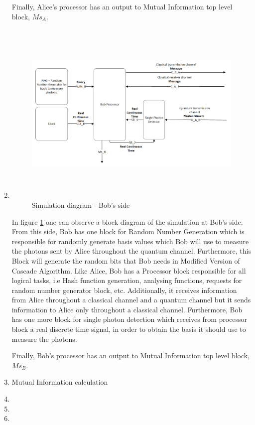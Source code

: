 \begin{enumerate}
    Finally, Alice's processor has an output to Mutual Information top level block, $Ms_{A}$.

  \item

  \begin{figure}[h]
	\centering
	\includegraphics[width=1.1\textwidth, height=9cm]{./sdf/ot_with_discrete_variables/figures/Simulation_Bob.png}
	\caption{Simulation diagram - Bob's side}\label{simulationbob}
\end{figure}

    In figure \ref{simulationbob} one can observe a block diagram of the simulation at Bob's side. From this side, Bob has one block for Random Number Generation which is responsible for randomly generate basis values which Bob will use to measure the photons sent by Alice throughout the quantum channel. Furthermore, this Block will generate the random bits that Bob needs in Modified Version of Cascade Algorithm. Like Alice, Bob has a Processor block responsible for all logical tasks, i.e Hash function generation, analysing functions, requests for random number generator block, etc. Additionally, it receives information from Alice throughout a classical channel and a quantum channel but it sends information to Alice only throughout a classical channel. Furthermore, Bob has one more block for single photon detection which receives from processor block a real discrete time signal, in order to obtain the basis it should use to measure the photons.

    Finally, Bob's processor has an output to Mutual Information top level block, $Ms_{B}$.

  \item Mutual Information calculation
  \item
  \item
  \item
\end{enumerate}





